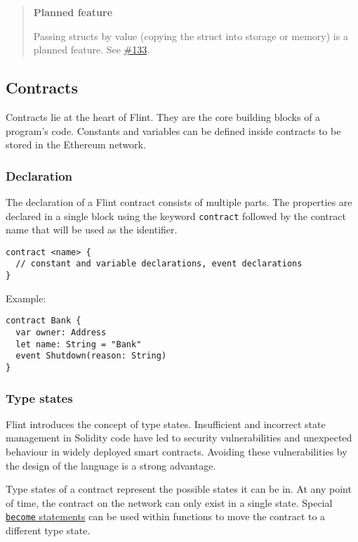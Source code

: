 \begin{quote}
\textbf{Planned feature}

Passing structs by value (copying the struct into storage or memory) is a planned feature. See \href{https://github.com/flintlang/flint/issues/133}{\#133}.
\end{quote}

\subsection{Contracts}
\label{sec:appendix-b-contracts}

Contracts lie at the heart of Flint. They are the core building blocks of a program's code. Constants and variables can be defined inside contracts to be stored in the Ethereum network.

\subsubsection{Declaration}
\label{sec:appendix-b-declaration-1}

The declaration of a Flint contract consists of multiple parts. The properties are declared in a single block using the keyword \texttt{contract} followed by the contract name that will be used as the identifier.

\begin{verbatim}
contract <name> {
  // constant and variable declarations, event declarations
}
\end{verbatim}

Example:

\begin{verbatim}
contract Bank {
  var owner: Address
  let name: String = "Bank"
  event Shutdown(reason: String)
}
\end{verbatim}

\subsubsection{Type states}
\label{sec:appendix-b-type-states}

Flint introduces the concept of type states. Insufficient and incorrect state management in Solidity code have led to security vulnerabilities and unexpected behaviour in widely deployed smart contracts. Avoiding these vulnerabilities by the design of the language is a strong advantage.

Type states of a contract represent the possible states it can be in. At any point of time, the contract on the network can only exist in a single state. Special \hyperref[sec:appendix-b-become-statements]{\texttt{become} statements} can be used within functions to move the contract to a different type state.

